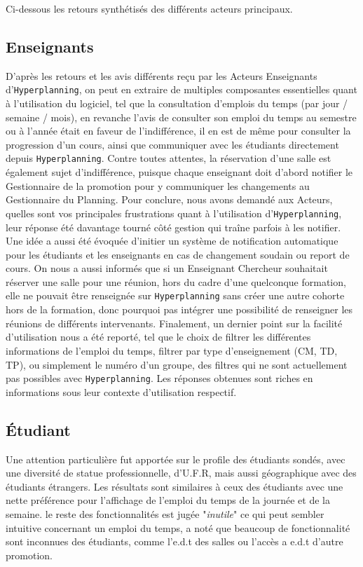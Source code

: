 \documentclass[a4paper,french,final]{memoir}
\begin{document}
Ci-dessous les retours synthétisés des différents acteurs principaux.

\subsection{Enseignants}
D'après les retours et les avis différents reçu par les Acteurs Enseignants d'\texttt{Hyperplanning}, on peut en extraire de multiples composantes essentielles quant à l'utilisation du logiciel,
tel que la consultation d'emplois du temps (par jour / semaine / mois), en revanche l'avis de consulter son emploi du temps au semestre ou à l'année était en faveur de l'indifférence, il en est de même pour consulter la progression d'un cours, ainsi que communiquer avec les étudiants directement depuis \texttt{Hyperplanning}.
Contre toutes attentes, la réservation d'une salle est également sujet d'indifférence, puisque chaque enseignant doit d'abord notifier le Gestionnaire de la promotion pour y communiquer les changements au Gestionnaire du Planning. Pour conclure, nous avons demandé aux Acteurs, quelles sont vos principales frustrations quant à l'utilisation d'\texttt{Hyperplanning}, leur réponse été davantage tourné côté gestion qui traîne parfois à les notifier. Une idée a aussi été évoquée d'initier un système de notification automatique pour les étudiants et les enseignants en cas de changement soudain ou report de cours.
On nous a aussi informés que si un Enseignant Chercheur souhaitait réserver une salle pour une réunion, hors du cadre d'une quelconque formation, elle ne pouvait être renseignée sur \texttt{Hyperplanning} sans créer une autre cohorte hors de la formation, donc pourquoi pas intégrer une possibilité de renseigner les réunions de différents intervenants.
Finalement, un dernier point sur la facilité d'utilisation nous a été reporté, tel que le choix de filtrer les différentes informations de l'emploi du temps, filtrer par type d'enseignement (CM, TD, TP), ou simplement le numéro d'un groupe, des filtres qui ne sont actuellement pas possibles avec \texttt{Hyperplanning}.
Les réponses obtenues sont riches en informations sous leur contexte d'utilisation respectif.

\subsection{Étudiant}
Une attention particulière fut apportée sur le profile des étudiants sondés, avec une diversité de statue professionnelle, d'U.F.R, mais aussi géographique avec des étudiants étrangers.
Les résultats sont similaires à ceux des étudiants avec une nette préférence pour l'affichage de l'emploi du temps de la journée et de la semaine. le reste des fonctionnalités est jugée  "\emph{inutile}" ce qui peut sembler intuitive concernant un emploi du temps, a noté que beaucoup de fonctionnalité sont inconnues des étudiants, comme l'e.d.t des salles ou l'accès a e.d.t d'autre promotion.
\end{document}
